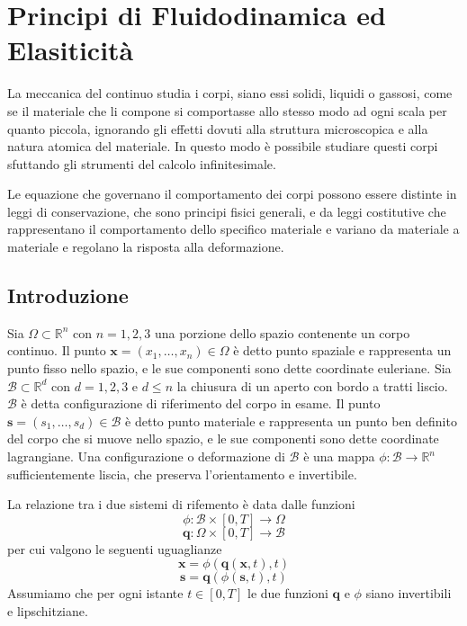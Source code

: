
\chapter{Principi di Fluidodinamica ed Elasiticità}
La meccanica del continuo studia i corpi, siano essi solidi, liquidi o gassosi, come se il materiale che li compone si comportasse allo stesso modo ad ogni scala per quanto piccola, ignorando gli effetti dovuti alla struttura microscopica e alla natura atomica del materiale. In questo modo è possibile studiare questi corpi sfuttando gli strumenti del calcolo infinitesimale.

Le equazione che governano il comportamento dei corpi possono essere distinte in leggi di conservazione, che sono principi fisici generali, e da leggi costitutive che rappresentano il comportamento dello specifico materiale e variano da materiale a materiale e regolano la risposta alla deformazione.

\section{Introduzione}
Sia $\Omega \subset \mathbb{R}^{n}$ con $n=1,2,3$ una porzione dello spazio contenente un corpo continuo. Il punto $\mathbf{x}=(x_1,\dots,x_n) \in \Omega$ è detto punto spaziale e rappresenta un punto fisso nello spazio, e le sue componenti sono dette coordinate euleriane.
Sia $\mathcal{B} \subset \mathbb{R}^{d}$ con $d=1,2,3$ e $d\leq n$ la chiusura di un aperto con bordo a tratti liscio. $\mathcal{B}$ è detta configurazione di riferimento del corpo in esame. Il punto $\mathbf{s}=(s_1,\dots,s_d) \in \mathcal{B}$ è detto punto materiale e rappresenta un punto ben definito del corpo che si muove nello spazio, e le sue componenti sono dette coordinate lagrangiane. Una configurazione o deformazione di $\mathcal{B}$ è una mappa $\phi: \mathcal{B} \to \mathbb{R}^{n}$ sufficientemente liscia, che preserva l'orientamento e invertibile. 

La relazione tra i due sistemi di rifemento è data dalle funzioni
\begin{equation*}  
\phi:\mathcal{B} \times [0,T] \to \Omega
\end{equation*}
\begin{equation*}  
\mathbf{q}:\Omega \times [0,T] \to \mathcal{B}
\end{equation*}
per cui valgono le seguenti uguaglianze
\begin{equation*}  
\mathbf{x} = \phi(\mathbf{q}(\mathbf{x},t),t)
\end{equation*}
\begin{equation*}  
\mathbf{s} = \mathbf{q}(\phi(\mathbf{s},t),t)
\end{equation*}
Assumiamo che per ogni istante $t\in [0,T]$ le due funzioni $\mathbf{q}$ e $\phi$ siano invertibili e lipschitziane.

